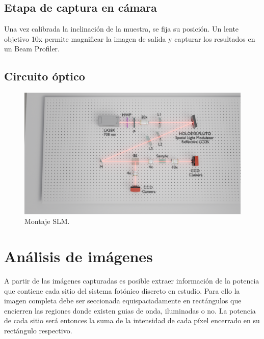 \subsection{Etapa de captura en cámara}
Una vez calibrada la inclinación de la muestra, se fija su posición. Un lente objetivo 10x permite magnificar la imagen de salida y capturar los resultados en un Beam Profiler.
\subsection{Circuito óptico}
\begin{figure}[H]
	\centering
	\includegraphics[width=\linewidth, trim={21cm 5cm 7cm 5cm},clip]{media/SLM_setupv1}
	\caption{Montaje SLM.}
\end{figure}
\section{Análisis de imágenes \label{sec:analimag}}
A partir de las imágenes capturadas es posible extraer información de la potencia que contiene cada sitio del sistema fotónico discreto en estudio. Para ello la imagen completa debe ser seccionada equispaciadamente en rectángulos que encierren las regiones donde existen guias de onda, iluminadas o no. La potencia de cada sitio será entonces la suma de la intensidad de cada píxel encerrado en su rectángulo respectivo.

